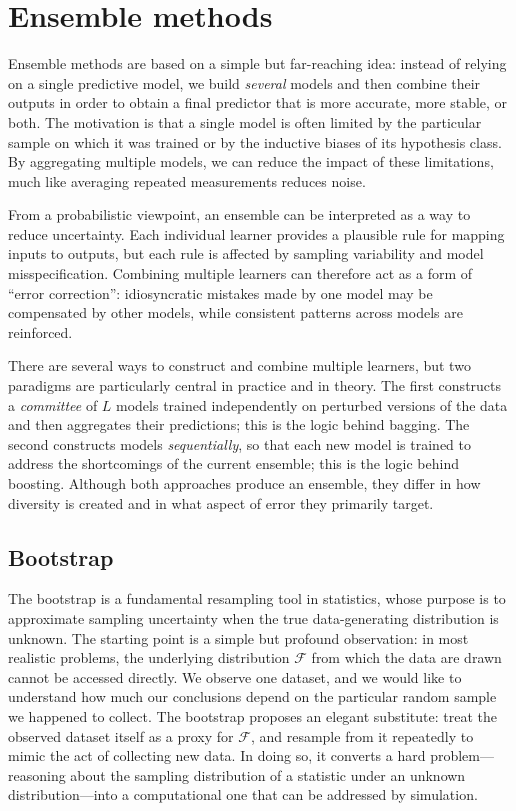 \chapter{Ensemble methods}

Ensemble methods are based on a simple but far-reaching idea: instead of relying on a single predictive model, we build \emph{several} models and then combine their outputs in order to obtain a final predictor that is more accurate, more stable, or both. The motivation is that a single model is often limited by the particular sample on which it was trained or by the inductive biases of its hypothesis class. By aggregating multiple models, we can reduce the impact of these limitations, much like averaging repeated measurements reduces noise.

From a probabilistic viewpoint, an ensemble can be interpreted as a way to reduce uncertainty. Each individual learner provides a plausible rule for mapping inputs to outputs, but each rule is affected by sampling variability and model misspecification. Combining multiple learners can therefore act as a form of ``error correction'': idiosyncratic mistakes made by one model may be compensated by other models, while consistent patterns across models are reinforced.

\medskip

There are several ways to construct and combine multiple learners, but two paradigms are particularly central in practice and in theory. The first constructs a \emph{committee} of $L$ models trained independently on perturbed versions of the data and then aggregates their predictions; this is the logic behind \alert{bagging}. The second constructs models \emph{sequentially}, so that each new model is trained to address the shortcomings of the current ensemble; this is the logic behind \alert{boosting}. Although both approaches produce an ensemble, they differ in how diversity is created and in what aspect of error they primarily target.

\section*{Bootstrap}

The \alert{bootstrap} is a fundamental resampling tool in statistics, whose purpose is to
approximate sampling uncertainty when the true data-generating distribution is unknown. The
starting point is a simple but profound observation: in most realistic problems, the
underlying distribution $\mathcal{F}$ from which the data are drawn cannot be accessed
directly. We observe one dataset, and we would like to understand how much our conclusions
depend on the particular random sample we happened to collect. The bootstrap proposes an
elegant substitute: treat the observed dataset itself as a proxy for $\mathcal{F}$, and
resample from it repeatedly to mimic the act of collecting new data. In doing so, it
converts a hard problem---reasoning about the sampling distribution of a statistic under an
unknown distribution---into a computational one that can be addressed by simulation.

